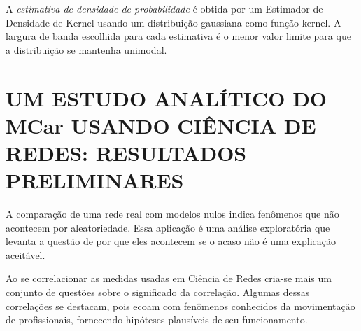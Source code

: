 \documentclass[12pt,a4paper]{article}
\begin{document}

A \textit{estimativa de densidade de probabilidade} é obtida por um Estimador de Densidade de Kernel usando um distribuição gaussiana como função kernel. A largura de banda escolhida para cada estimativa é o menor valor limite para que a distribuição se mantenha unimodal.

\section{UM ESTUDO ANALÍTICO DO MCar USANDO CIÊNCIA DE REDES: RESULTADOS PRELIMINARES} \label{sec:resultados-preliminares}

A comparação de uma rede real com modelos nulos indica fenômenos que não acontecem por aleatoriedade. Essa aplicação é uma análise exploratória que levanta a questão de por que eles acontecem se o acaso não é uma explicação aceitável.

Ao se correlacionar as medidas usadas em Ciência de Redes cria-se mais um conjunto de questões sobre o significado da correlação. Algumas dessas correlações se destacam, pois ecoam com fenômenos conhecidos da movimentação de profissionais, fornecendo hipóteses plausíveis de seu funcionamento.

\end{document}
